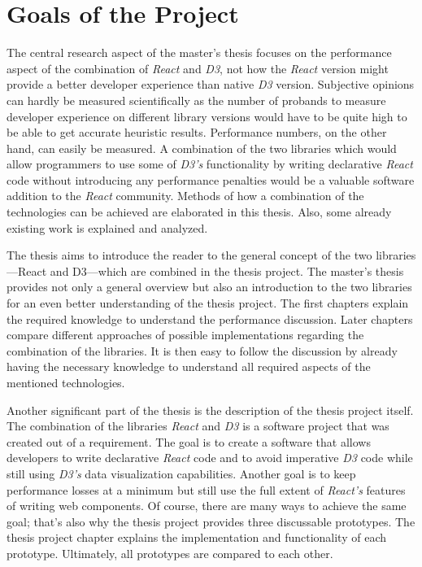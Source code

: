 \section{Goals of the Project}

The central research aspect of the master's thesis focuses on the performance aspect of the combination of \emph{React} and \emph{D3}, not how the \emph{React} version might provide a better developer experience than native \emph{D3} version. Subjective opinions can hardly be measured scientifically as the number of probands to measure developer experience on different library versions would have to be quite high to be able to get accurate heuristic results. Performance numbers, on the other hand, can easily be measured. A combination of the two libraries which would allow programmers to use some of \emph{D3's} functionality by writing declarative \emph{React} code without introducing any performance penalties would be a valuable software addition to the \emph{React} community. Methods of how a combination of the technologies can be achieved are elaborated in this thesis. Also, some already existing work is explained and analyzed.

The thesis aims to introduce the reader to the general concept of the two libraries---React and D3---which are combined in the thesis project. The master's thesis provides not only a general overview but also an introduction to the two libraries for an even better understanding of the thesis project. The first chapters explain the required knowledge to understand the performance discussion. Later chapters compare different approaches of possible implementations regarding the combination of the libraries. It is then easy to follow the discussion by already having the necessary knowledge to understand all required aspects of the mentioned technologies.

Another sig\-nifi\-cant part of the thesis is the description of the thesis project itself. The combination of the libraries \emph{React} and \emph{D3} is a software project that was created out of a requirement. The goal is to create a software that allows developers to write declarative \emph{React} code and to avoid imperative \emph{D3} code while still using \emph{D3's} data visualization capabilities. Another goal is to keep performance losses at a minimum but still use the full extent of \emph{React's} features of writing web components. Of course, there are many ways to achieve the same goal; that's also why the thesis project provides three discussable prototypes. The thesis project chapter explains the implementation and functionality of each prototype. Ultimately, all prototypes are compared to each other.

